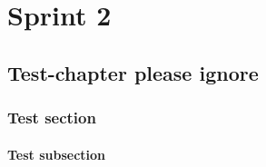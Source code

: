\part{Sprint 2}
\chapter{Test-chapter please ignore}
\section{Test section}
\subsection{Test subsection}